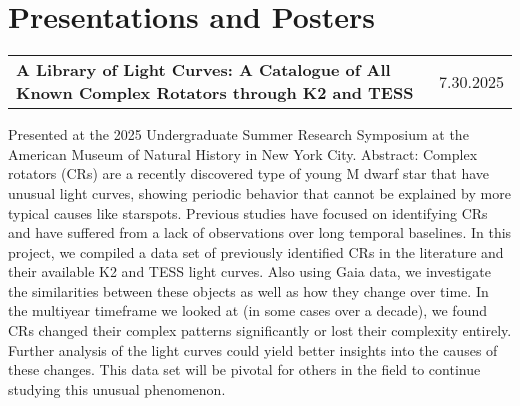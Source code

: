 \documentclass[a4paper,12pt]{article}
\makeatletter
\newenvironment{jobshort}[2]
    {
    \begin{tabularx}{\linewidth}{@{}X r@{}}
    {\raggedright\arraybackslash\nohyphens{#1}} & #2 \\[3.75pt]
    \end{tabularx}
    }
    {}
\makeatother
\begin{document}
\section{Presentations and Posters}
\begin{jobshort}{\textbf{A Library of Light Curves: A Catalogue of All Known Complex Rotators through K2 and TESS}}{7.30.2025}
Presented at the 2025 Undergraduate Summer Research Symposium at the American Museum of Natural History in New York City. Abstract: Complex rotators (CRs) are a recently discovered type of young M dwarf star that have unusual light curves, showing periodic behavior that cannot be explained by more typical causes like starspots. Previous studies have focused on identifying CRs and have suffered from a lack of observations over long temporal baselines. In this project, we compiled a data set of previously identified CRs in the literature and their available K2 and TESS light curves. Also using Gaia data, we investigate the similarities between these objects as well as how they change over time. In the multiyear timeframe we looked at (in some cases over a decade), we found CRs changed their complex patterns significantly or lost their complexity entirely. Further analysis of the light curves could yield better insights into the causes of these changes. This data set will be pivotal for others in the field to continue studying this unusual phenomenon.
\end{jobshort}
\end{document}
